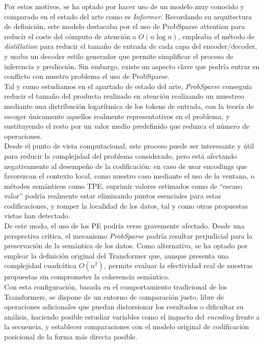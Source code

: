 Por estos motivos, se ha optado por hacer uso de un modelo muy conocido y comparado en el estado del arte como es \textit{Informer}. Recordando su arquitectura de definición, este modelo destacaba por el uso de ProbSparse attention para reducir el coste del cómputo de atención a $O(n \log{n})$, empleaba el método de \textit{distillation} para reducir el tamaño de entrada de cada capa del encoder/decoder, y usaba un decoder estilo generador que permite simplificar el proceso de inferencia y predicción. Sin embargo, existe un aspecto clave que podría entrar en conflicto con nuestro problema el uso de ProbSparse.\\

Tal y como estudiamos en el apartado de estado del arte, \textit{ProbSparse} conseguía reducir el tamaño del producto realizado en atención realizando un muestreo mediante una distribución logarítmica de los tokens de entrada, con la teoría de escoger únicamente aquellos realmente representativos en el problema, y sustituyendo el resto por un valor medio predefinido que reduzca el número de operaciones.\\
	
Desde el punto de vista computacional, este proceso puede ser interesante y útil para reducir la complejidad del problema considerado, pero está afectando negativamente al desempeño de la codificación: en caso de usar encodings que favorezcan el contexto local, como nuestro caso mediante el uso de la ventana, o métodos semánticos como TPE, suprimir valores estimados como de ``escaso valor'' podría realmente estar eliminando puntos esenciales para estas codificaciones, y romper la localidad de los datos, tal y como otras propuestas vistas han detectado.\\

De este modo, el uso de los PE podría verse gravemente afectado. Desde una perspectiva crítica, el mecanismo \textit{ProbSparse} podría resultar perjudicial para la preservación de la semántica de los datos. Como alternativa, se ha optado por emplear la definición original del Transformer que, aunque presenta una complejidad cuadrática $O(n^2)$, permite evaluar la efectividad real de nuestras propuestas sin comprometer la coherencia semántica.\\

Con esta configuración, basada en el comportamiento tradicional de los Transformers, se dispone de un entorno de comparación justo, libre de operaciones adicionales que puedan distorsionar los resultados o dificultar su análisis, haciendo posible estudiar variables como el impacto del \textit{encoding} frente a la secuencia, y establecer comparaciones con el modelo original de codificación posicional de la forma más directa posible.

